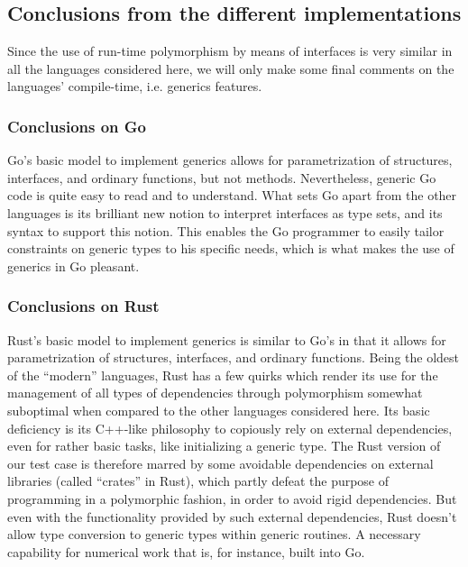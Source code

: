 \documentclass[11pt,oneside]{article}
\begin{document}


\subsection{Conclusions from the different implementations}

Since the use of run-time polymorphism by means of interfaces is very
similar in all the languages considered here, we will only make some final
comments on the languages' compile-time, i.e.  generics features.

\subsubsection{Conclusions on Go}

Go's basic model to implement generics allows for parametrization of
structures, interfaces, and ordinary functions, but not methods.
Nevertheless, generic Go code is quite easy to read and to understand.
What sets Go apart from the other languages is its brilliant new
notion to interpret interfaces as type sets, and its syntax to support
this notion. This enables the Go programmer to easily tailor
constraints on generic types to his specific needs, which is what
makes the use of generics in Go pleasant.

\subsubsection{Conclusions on Rust}

Rust's basic model to implement generics is similar to Go's in that it
allows for parametrization of structures, interfaces, and ordinary
functions. Being the oldest of the ``modern'' languages, Rust has a
few quirks which render its use for the management of all types of
dependencies through polymorphism somewhat suboptimal when compared to
the other languages considered here. Its basic deficiency is its
C++-like philosophy to copiously rely on external dependencies, even
for rather basic tasks, like initializing a generic type. The Rust
version of our test case is therefore marred by some avoidable
dependencies on external libraries (called ``crates'' in Rust), which
partly defeat the purpose of programming in a polymorphic fashion, in
order to avoid rigid dependencies. But even with the functionality
provided by such external dependencies, Rust doesn't allow type
conversion to generic types within generic routines. A necessary
capability for numerical work that is, for instance, built into Go.
\end{document}
